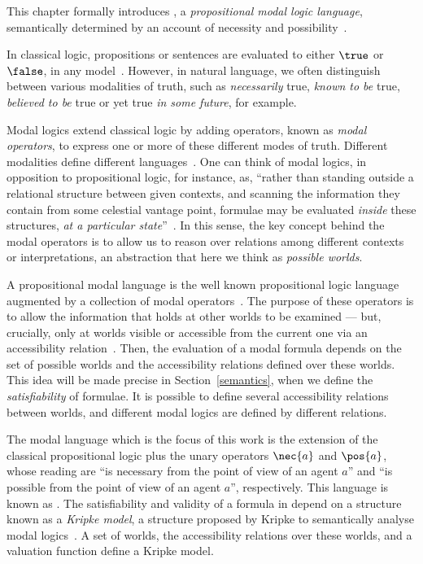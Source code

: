 This chapter formally introduces , a \emph{propositional modal
logic language}, semantically determined by an account of necessity and
possibility~\cite{journals/jal/NalonD07}.

In classical logic, propositions or sentences are evaluated to either $\true$ or
$\false$, in any model~\cite{kleene2002mathematical}. However, in natural
language, we often distinguish between various modalities of truth, such as
\emph{necessarily} true, \emph{known to be} true, \emph{believed to be} true or
yet true \emph{in some future}, for example. 


Modal logics extend classical logic by adding operators, known as
\emph{modal operators}, to express one or more of these different modes of truth.
Different modalities define different languages~\cite{blackburn2002modal}. One
can think of modal logics, in opposition to propositional logic, for instance,
as, ``rather than standing outside a relational structure between given contexts,
and scanning the information they contain from some celestial vantage point,
formulae may be evaluated \emph{inside} these structures, \emph{at a particular
state}''~\cite{blackburn2002modal}. In this sense, the key concept behind the
modal operators is to allow us to reason over relations among different contexts or
interpretations, an abstraction that here we think as \emph{possible worlds}. 

A propositional modal language is the well known propositional logic language
augmented by a collection of modal operators~\cite{blackburn2002modal}.
The purpose of these operators is to allow the information that holds at
other worlds to be examined --- but, crucially, only at worlds visible or
accessible from the current one via an accessibility
relation~\cite{blackburn2002modal}. Then, the evaluation of a modal formula
depends on the set of possible worlds and the accessibility relations defined
over these worlds. This idea will be made precise in 
Section~\ref{semantics}, when we define the \emph{satisfiability} of
formulae.  It is possible to define several accessibility relations between
worlds, and different modal logics are defined by different relations.

The modal language which is the focus of this work is the extension of the
classical propositional logic plus the unary operators $\nec{a}$ and $\pos{a}$,
whose reading are ``is necessary from the point of view of an agent $a$'' and
``is possible from the point of view of an agent $a$'', respectively. This
language is known as . The
satisfiability and validity of a formula in  depend on a
structure known as a \emph{Kripke model}, a structure proposed
by Kripke to semantically analyse modal logics~\cite{kripke:i}. 
A set of worlds, the accessibility relations over these worlds, and a valuation
function define a Kripke model. 

